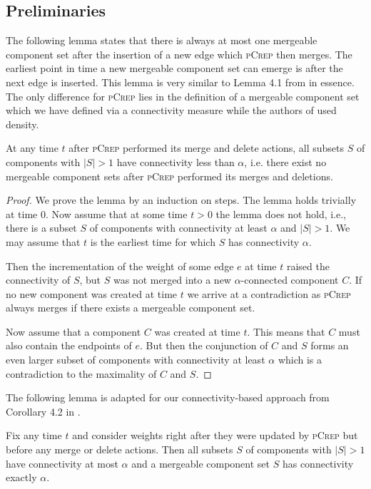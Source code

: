\documentclass[a4paper,UKenglish,cleveref, autoref, thm-restate,authorcolumns]{lipics-v2019}
\newcommand{\adjDel}{\textsc{pCrep}}
\begin{document}
\subsection{Preliminaries}

The following lemma states that there is always at most one mergeable component set after the insertion of a new edge which \adjDel{} then merges. The earliest point in time a new mergeable component set can emerge is after the next edge is inserted. This lemma is very similar to Lemma 4.1 from \cite{Avin2015} in essence. The only difference for \adjDel{} lies in the definition of a mergeable component set which we have defined via a connectivity measure while the authors of \cite{Avin2015} used density.

\begin{lemma}
	\label{mergeableLemma}
	At any time $t$ after \adjDel{} performed its merge and delete actions, all subsets $S$ of components with $|S|>1$ have connectivity less than $\alpha$, i.e. there exist no mergeable component sets after \adjDel{} performed its merges and deletions.
\end{lemma}
\begin{proof}
	We prove the lemma by an induction on steps. The lemma holds trivially at time 0.
	Now assume that at some time $t>0$ the lemma does not hold, i.e., there is a subset $S$ of components with connectivity at least $\alpha$ and $|S|>1$. We may assume that $t$ is the earliest time for which $S$ has connectivity $\alpha$.
	
	Then the incrementation of the weight of some edge $e$ at time $t$ raised the connectivity of $S$, but $S$ was not merged into a new $\alpha$-connected component $C$. If no new component was created at time $t$ we arrive at a contradiction as \adjDel{} always merges if there exists a mergeable component set.
	
	Now assume that a component $C$ was created at time $t$. This means that $C$ must also contain the endpoints of $e$. But then the conjunction of $C$ and $S$ forms an even larger subset of components with connectivity at least $\alpha$ which is a contradiction to the maximality of $C$ and $S$.
\end{proof}

The following lemma is adapted for our connectivity-based approach from Corollary 4.2 in \cite{Avin2015}.

\begin{lemma}
	\label{mergeable_lemma}
	Fix any time $t$ and consider weights right after they were updated by \adjDel{} but before any merge or delete actions. Then all subsets $S$ of components with $|S|>1$ have connectivity at most $\alpha$ and a mergeable component set $S$ has connectivity exactly $\alpha$.
\end{lemma}
\end{document}
